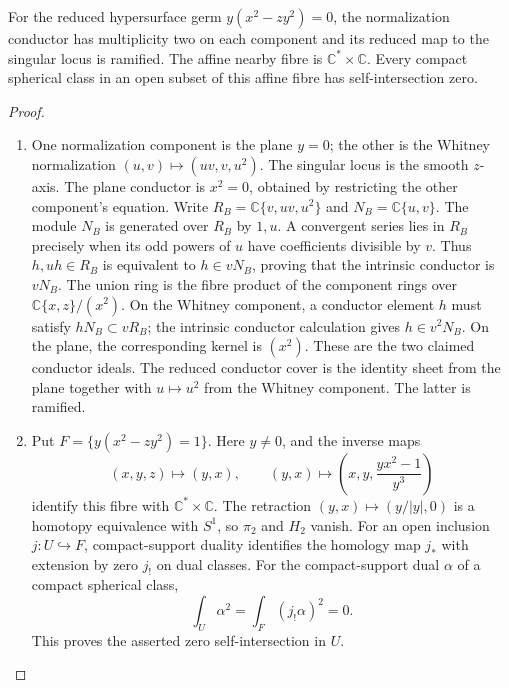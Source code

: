 \begin{proposition}\hypertarget{tag-02WQ}{}\label{night:P4.19}\label{stmt:P4.19}

For the reduced hypersurface germ $y(x^2-zy^2)=0$, the normalization
conductor has multiplicity two on each component and its reduced
map to the singular locus is ramified. The affine nearby fibre is
$\mathbb C^*\times\mathbb C$. Every compact spherical class
in an open subset of this affine fibre has self-intersection zero.
\end{proposition}
\begin{proof}

\begin{enumerate}[label={$\langle1\rangle$\arabic*.},leftmargin=*]
\item One normalization component is the plane $y=0$; the other is
the Whitney normalization $(u,v)\mapsto(uv,v,u^2)$.
The singular locus is the smooth $z$-axis. The plane conductor
is $x^2=0$, obtained by restricting the other component's
equation. Write $R_B=\mathbb C\{v,uv,u^2\}$ and
$N_B=\mathbb C\{u,v\}$. The module $N_B$ is generated over
$R_B$ by $1,u$. A convergent series lies in $R_B$ precisely when
its odd powers of $u$ have coefficients divisible by $v$.
Thus $h,uh\in R_B$ is equivalent to $h\in vN_B$, proving
that the intrinsic conductor is $vN_B$.
The union ring is the fibre product of the component rings over
$\mathbb C\{x,z\}/(x^2)$. On the Whitney component, a
conductor element $h$ must satisfy $hN_B\subset vR_B$; the
intrinsic conductor calculation gives $h\in v^2N_B$.
On the plane, the corresponding kernel is $(x^2)$.
These are the two claimed conductor ideals.
The reduced conductor cover is the identity sheet from the
plane together with $u\mapsto u^2$ from the Whitney component.
The latter is ramified.

\item Put $F=\{y(x^2-zy^2)=1\}$. Here $y\ne0$, and the inverse maps
\[
 (x,y,z)\longmapsto(y,x),\qquad
 (y,x)\longmapsto\left(x,y,\frac{yx^2-1}{y^3}\right)
\]
identify this fibre with $\mathbb C^*\times\mathbb C$.
The retraction $(y,x)\mapsto(y/|y|,0)$ is a homotopy equivalence
with $S^1$, so $\pi_2$ and $H_2$ vanish. For an open inclusion
$j:U\hookrightarrow F$, compact-support duality identifies the
homology map $j_*$ with extension by zero $j_!$ on dual classes.
For the compact-support dual $\alpha$ of a compact spherical class,
\[
 \int_U\alpha^2=\int_F(j_!\alpha)^2=0.
\]
This proves the asserted zero self-intersection in $U$.

\end{enumerate}
\end{proof}